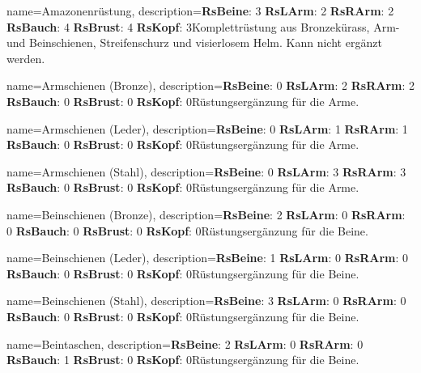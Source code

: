 {
    name={Amazonenrüstung},
    description={\textbf{RsBeine}: 3 \textbf{RsLArm}: 2 \textbf{RsRArm}: 2 \textbf{RsBauch}: 4 \textbf{RsBrust}: 4 \textbf{RsKopf}: 3\newline Komplettrüstung aus Bronzekürass, Arm- und Beinschienen, Streifenschurz und visierlosem Helm. Kann nicht ergänzt werden.}
}


{
    name={Armschienen (Bronze)},
    description={\textbf{RsBeine}: 0 \textbf{RsLArm}: 2 \textbf{RsRArm}: 2 \textbf{RsBauch}: 0 \textbf{RsBrust}: 0 \textbf{RsKopf}: 0\newline Rüstungsergänzung für die Arme.}
}


{
    name={Armschienen (Leder)},
    description={\textbf{RsBeine}: 0 \textbf{RsLArm}: 1 \textbf{RsRArm}: 1 \textbf{RsBauch}: 0 \textbf{RsBrust}: 0 \textbf{RsKopf}: 0\newline Rüstungsergänzung für die Arme.}
}


{
    name={Armschienen (Stahl)},
    description={\textbf{RsBeine}: 0 \textbf{RsLArm}: 3 \textbf{RsRArm}: 3 \textbf{RsBauch}: 0 \textbf{RsBrust}: 0 \textbf{RsKopf}: 0\newline Rüstungsergänzung für die Arme.}
}


{
    name={Beinschienen (Bronze)},
    description={\textbf{RsBeine}: 2 \textbf{RsLArm}: 0 \textbf{RsRArm}: 0 \textbf{RsBauch}: 0 \textbf{RsBrust}: 0 \textbf{RsKopf}: 0\newline Rüstungsergänzung für die Beine.}
}


{
    name={Beinschienen (Leder)},
    description={\textbf{RsBeine}: 1 \textbf{RsLArm}: 0 \textbf{RsRArm}: 0 \textbf{RsBauch}: 0 \textbf{RsBrust}: 0 \textbf{RsKopf}: 0\newline Rüstungsergänzung für die Beine.}
}


{
    name={Beinschienen (Stahl)},
    description={\textbf{RsBeine}: 3 \textbf{RsLArm}: 0 \textbf{RsRArm}: 0 \textbf{RsBauch}: 0 \textbf{RsBrust}: 0 \textbf{RsKopf}: 0\newline Rüstungsergänzung für die Beine.}
}


{
    name={Beintaschen},
    description={\textbf{RsBeine}: 2 \textbf{RsLArm}: 0 \textbf{RsRArm}: 0 \textbf{RsBauch}: 1 \textbf{RsBrust}: 0 \textbf{RsKopf}: 0\newline Rüstungsergänzung für die Beine.}
}


